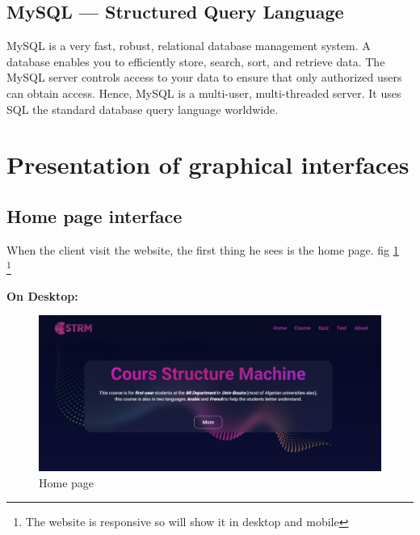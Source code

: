 \subsection{MySQL — Structured Query Language}
MySQL is a very fast, robust, relational database management system. A database enables you to efficiently store, search, sort, and retrieve data. The MySQL server controls access to your data to ensure that only authorized users can obtain access. Hence, MySQL is a multi-user, multi-threaded server. It uses SQL the standard database query language worldwide.\cite{welling2003php}




\section{Presentation of graphical interfaces}


\subsection{Home page interface}
When the client visit the website, the first thing he sees is the home page. fig \ref{fig:Homepage1}\\
\footnote[2]{The website is responsive so will show it in desktop and mobile\cite{noauthor_undated-an}}

\textbf{On Desktop:}
\begin{figure}[ht]
	\centering
	\label{}\includegraphics[scale=0.5]{img/0.jpg}                
	\caption{Home page} 
	\label{fig:Homepage1}
\end{figure} 



